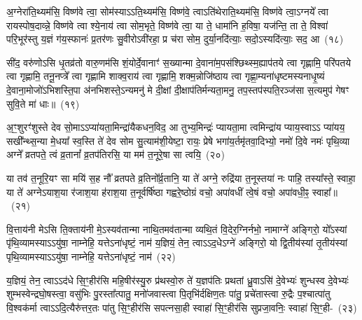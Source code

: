 {\anuvakamend[{मि॒त्रस्य॒ त्रयो॑विꣳशतिश्च}]}%

अ॒ग्नेरा॑ति॒थ्यम॑सि॒ विष्ण॑वे त्वा॒ सोम॑स्या\-ऽ\-ऽति॒थ्यम॑सि॒ विष्ण॑वे॒ त्वा\-ऽति॑थेराति॒थ्यम॑सि॒ विष्ण॑वे त्वा॒\-ऽग्नये᳚ त्वा रायस्पोष॒दाव्न्ने॒ विष्ण॑वे त्वा श्ये॒नाय॑ त्वा सोम॒भृते॒ विष्ण॑वे त्वा॒ या ते॒ धामा॑नि ह॒विषा॒ यज॑न्ति॒ ता ते॒ विश्वा॑ परि॒भूर॑स्तु य॒ज्ञं ग॑य॒स्फानः॑ प्र॒तर॑णः सु॒वीरो\-ऽवी॑रहा॒ प्र च॑रा सोम॒ दुर्या॒नदि॑त्याः॒ सदो॒\-ऽस्यदि॑त्याः॒ सद॒ आ~(१८)

सी॑द॒ वरु॑णो\-ऽसि धृ॒तव्र॑तो वारु॒णम॑सि शं॒योर्दे॒वानाꣳ॑ स॒ख्यान्मा दे॒वाना॑म॒पस॑श्छिथ्स्म॒ह्याप॑तये त्वा गृह्णामि॒ परि॑पतये त्वा गृह्णामि॒ तनू॒नप्त्रे᳚ त्वा गृह्णामि शाक्व॒राय॑ त्वा गृह्णामि॒ शक्म॒न्नोजि॑ष्ठाय त्वा गृह्णा॒म्यना॑धृष्टम\-स्यनाधृ॒ष्यं दे॒वाना॒मोजो॑\-ऽभिशस्ति॒पा अ॑नभिशस्ते॒\-ऽन्यमनु॑ मे दी॒क्षां दी॒क्षाप॑तिर्मन्यता॒मनु॒ तप॒स्तप॑स्पति॒रञ्ज॑सा स॒त्यमुप॑ गेषꣳ सुवि॒ते मा॑ धाः॥~(१९)

{\anuvakamend[{आ मैकं॑ च}]}%

अ॒ꣳ॒शुरꣳ॑शुस्ते देव सो॒मा\-ऽ\-ऽप्या॑यता॒मिन्द्रा॑यैकधन॒विद॒ आ तुभ्य॒मिन्द्रः॑ प्यायता॒मा त्वमिन्द्रा॑य प्याय॒स्वा\-ऽ\-ऽ प्या॑यय॒ सखी᳚न्थ्स॒न्या मे॒धया᳚ स्व॒स्ति ते॑ देव सोम सु॒त्याम॑शी॒येष्टा॒ रायः॒ प्रेषे भगा॑य॒र्तमृ॑तवा॒दिभ्यो॒ नमो॑ दि॒वे नमः॑ पृथि॒व्या अग्ने᳚ व्रतपते॒ त्वं व्र॒तानां᳚ व्र॒तप॑तिरसि॒ या मम॑ त॒नूरे॒षा सा त्वयि॒~(२०)

या तव॑ त॒नूरि॒यꣳ सा मयि॑ स॒ह नौ᳚ व्रतपते व्र॒तिनो᳚र्व्र॒तानि॒ या ते॑ अग्ने॒ रुद्रि॑या त॒नूस्तया॑ नः पाहि॒ तस्या᳚स्ते॒ स्वाहा॒ या ते॑ अग्ने\-ऽयाश॒या र॑जाश॒या ह॑राश॒या त॒नूर्वर्\mbox{}षि॑ष्ठा गह्वरे॒ष्ठोग्रं वचो॒ अपा॑वधीं त्वे॒षं वचो॒ अपा॑वधी॒ꣴ॒ स्वाहा᳚॥~(२१)

{\anuvakamend[{त्वयि॑ चत्वारि॒ꣳ॒शच्च॑}]}%

वि॒त्ताय॑नी मे\-ऽसि ति॒क्ताय॑नी मे॒\-ऽस्यव॑तान्मा नाथि॒तमव॑तान्मा व्यथि॒तं वि॒देर॒ग्निर्नभो॒ नामाग्ने॑ अङ्गिरो॒ यो᳚\-ऽस्यां पृ॑थि॒व्यामस्याऽऽयु॑षा॒ नाम्नेहि॒ यत्ते\-ऽना॑धृष्टं॒ नाम॑ य॒ज्ञियं॒ तेन॒ त्वा\-ऽ\-ऽद॒धे\-ऽग्ने॑ अङ्गिरो॒ यो द्वि॒तीय॑स्यां तृ॒तीय॑स्यां पृथि॒व्यामस्याऽऽयु॑षा॒ नाम्नेहि॒ यत्ते\-ऽना॑धृष्टं॒ नाम॑~(२२)

य॒ज्ञियं॒ तेन॒ त्वा\-ऽ\-ऽद॑धे सि॒ꣳ॒हीर॑सि महि॒षीर॑स्यु॒रु प्र॑थस्वो॒रु ते॑ य॒ज्ञप॑तिः प्रथतां ध्रु॒वा\-ऽसि॑ दे॒वेभ्यः॑ शुन्धस्व दे॒वेभ्यः॑ शुम्भस्वेन्द्रघो॒षस्त्वा॒ वसु॑भिः पु॒रस्ता᳚त्पातु॒ मनो॑जवास्त्वा पि॒तृभि॑र्दक्षिण॒तः पा॑तु॒ प्रचे॑तास्त्वा रु॒द्रैः प॒श्चात्पा॑तु वि॒श्वक॑र्मा त्वा\-ऽ\-ऽदि॒त्यैरु॑त्तर॒तः पा॑तु सि॒ꣳ॒हीर॑सि सपत्नसा॒ही स्वाहा॑ सि॒ꣳ॒हीर॑सि सुप्रजा॒वनिः॒ स्वाहा॑ सि॒ꣳ॒ही-~(२३)

